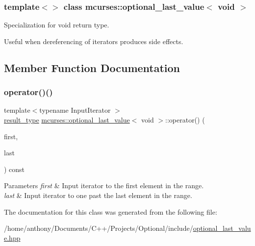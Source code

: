 \subsubsection*{template$<$$>$\newline
class mcurses\+::optional\+\_\+last\+\_\+value$<$ void $>$}

Specialization for void return type. 

Useful when dereferencing of iterators produces side effects. 

\subsection{Member Function Documentation}
\hypertarget{classmcurses_1_1optional__last__value_3_01void_01_4_af07a5836fc2c1556b262cb9a4920370c}{}\label{classmcurses_1_1optional__last__value_3_01void_01_4_af07a5836fc2c1556b262cb9a4920370c} 
\subsubsection{\texorpdfstring{operator()()}{operator()()}}
{\footnotesize\ttfamily template$<$typename Input\+Iterator $>$ \\
\hyperlink{classmcurses_1_1optional__last__value_3_01void_01_4_a0b16df56f492da881527bff6c6da74cd}{result\+\_\+type} \hyperlink{classmcurses_1_1optional__last__value}{mcurses\+::optional\+\_\+last\+\_\+value}$<$ void $>$\+::operator() (\begin{DoxyParamCaption}\item[{Input\+Iterator}]{first,  }\item[{Input\+Iterator}]{last }\end{DoxyParamCaption}) const\hspace{0.3cm}{\ttfamily [inline]}}


\begin{DoxyParams}{Parameters}
{\em first} & Input iterator to the first element in the range. \\
\hline
{\em last} & Input iterator to one past the last element in the range. \\
\hline
\end{DoxyParams}


The documentation for this class was generated from the following file\+:\begin{DoxyCompactItemize}
\item 
/home/anthony/\+Documents/\+C++/\+Projects/\+Optional/include/\hyperlink{optional__last__value_8hpp}{optional\+\_\+last\+\_\+value.\+hpp}\end{DoxyCompactItemize}
